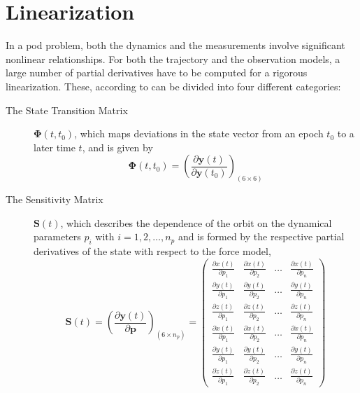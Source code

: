 \section{Linearization}\label{sec:pod-linearization}

In a \gls{pod} problem, both the dynamics and the measurements involve significant 
nonlinear relationships. For both the trajectory and the observation models, a large 
number of partial derivatives have to be computed for a rigorous linearization. These, 
according to \cite{Montenbruck2000} can be divided into four different categories:
\begin{description}
  \item[The State Transition Matrix] $\bm{\Phi}(t,t_0)$, which maps deviations in the 
    state vector from an epoch $t_0$ to a later time $t$, and is given by
    \begin{equation}\label{eq:mont71}
      \bm{\Phi} (t,t_0) = \left(
          \frac{\partial \bm{y}(t)}{\partial \bm{y}(t_0)} 
        \right) _{(6 \times 6)}
    \end{equation}

  \item[The Sensitivity Matrix] $\bm{S}(t)$, which describes the dependence of the 
    orbit on the dynamical parameters $p_i$ with $i=1,2,\dots ,n_p$ and is formed 
    by the respective partial derivatives of the state with respect to the force 
    model, 
    \begin{equation}\label{eq:mont72}
      \bm{S} (t) = \left(
          \frac{\partial \bm{y}(t)}{\partial \bm{p}} 
        \right) _{(6 \times n_p)}
        = \begin{pmatrix} 
          \frac{\partial x(t)}{\partial p_1} & \frac{\partial x(t)}{\partial p_2} & \dots & \frac{\partial x(t)}{\partial p_n} \\
          \frac{\partial y(t)}{\partial p_1} & \frac{\partial y(t)}{\partial p_2} & \dots & \frac{\partial y(t)}{\partial p_n} \\
          \frac{\partial z(t)}{\partial p_1} & \frac{\partial z(t)}{\partial p_2} & \dots & \frac{\partial z(t)}{\partial p_n} \\
          \frac{\partial \dot{x}(t)}{\partial p_1} & \frac{\partial \dot{x}(t)}{\partial p_2} & \dots & \frac{\partial \dot{x}(t)}{\partial p_n} \\
          \frac{\partial \dot{y}(t)}{\partial p_1} & \frac{\partial \dot{y}(t)}{\partial p_2} & \dots & \frac{\partial \dot{y}(t)}{\partial p_n} \\
          \frac{\partial \dot{z}(t)}{\partial p_1} & \frac{\partial \dot{z}(t)}{\partial p_2} & \dots & \frac{\partial \dot{z}(t)}{\partial p_n}
      \end{pmatrix}
    \end{equation}


\end{description}
